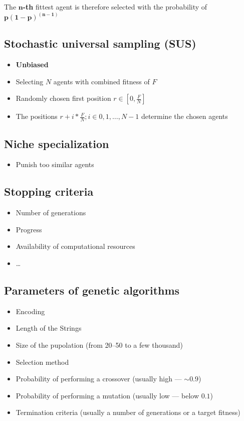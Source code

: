 \documentclass{article}
\begin{document}
        \noindent The $\mathbf{n}$\textbf{-th} fittest agent is therefore selected with the probability of $\mathbf{p{(1-p)}^{(n-1)}}$ 

        \subsection{Stochastic universal sampling (SUS)}
        \begin{itemize}
            \item \textbf{Unbiased}
            \item Selecting $N$ agents with combined fitness of $F$
            \item Randomly chosen first position $r \in [0, \frac{F}{N}]$
            \item The positions $r + i * \frac{F}{N}; i \in 0, 1, \ldots, N-1$ determine the chosen agents
        \end{itemize}

        \subsection{Niche specialization}
        \begin{itemize}
            \item Punish too similar agents
        \end{itemize}

        \subsection{Stopping criteria}
        \begin{itemize}
            \item Number of generations
            \item Progress
            \item Availability of computational resources
            \item \ldots
        \end{itemize}

        \subsection{Parameters of genetic algorithms}
        \begin{itemize}
            \item Encoding
            \item Length of the Strings
            \item Size of the pupolation (from 20--50 to a few thousand)
            \item Selection method
            \item Probability of performing a crossover (usually high --- $\sim 0.9$)
            \item Probability of performing a mutation (usually low --- below $0.1$)
            \item Termination criteria (usually a number of generations or a target fitness)
        \end{itemize}
\end{document}
